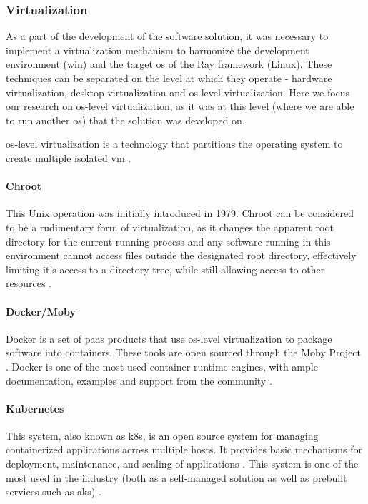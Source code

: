 \FloatBarrier

\subsubsection{Virtualization}

As a part of the development of the software solution, it was necessary to implement a virtualization mechanism to harmonize the development environment (\acrshort{win}) and the target \acrfull{os} of the Ray framework (Linux). These techniques can be separated on the level at which they operate - hardware virtualization, desktop virtualization and \acrshort{os}-level virtualization. Here we focus our research on \acrshort{os}-level virtualization, as it was at this level (where we are able to run another \acrshort{os}) that the solution was developed on.

\acrshort{os}-level virtualization is a technology that partitions the operating system to create multiple isolated \acrfull{vm} \parencite{10.5555/1571423}.

\paragraph{Chroot} This Unix operation was initially introduced in 1979. Chroot can be considered to be a rudimentary form of virtualization, as it changes the apparent root directory for the current running process and any software running in this environment cannot access files outside the designated root directory, effectively limiting it's access to a directory tree, while still allowing access to other resources \parencite{foundation_2017}.

\paragraph{Docker/Moby} Docker is a set of \acrfull{paas} products that use \acrshort{os}-level virtualization to package software into containers. These tools are open sourced through the Moby Project \parencite{moby_oro}. Docker is one of the most used container runtime engines, with ample documentation, examples and support from the community \parencite[p. 20]{stateofcontainers}.

\paragraph{Kubernetes} This system, also known as \acrshort{k8s}, is an open source system for managing containerized applications across multiple hosts. It provides basic mechanisms for deployment, maintenance, and scaling of applications \parencite{kubernetes}. This system is one of the most used in the industry (both as a self-managed solution as well as prebuilt services such as \acrfull{aks}) \parencite{stateofcontainers}.


